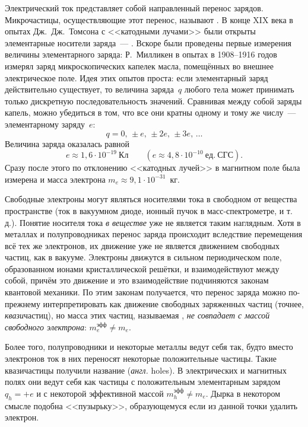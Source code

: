 Электрический ток представляет собой направленный перенос зарядов. Микрочастицы,
осуществляющие этот перенос, называют . В конце
XIX века в опытах Дж.~Дж.~Томсона с <<катодными лучами>> были открыты
элементарные носители заряда~--- . Вскоре были проведены
первые измерения величины элементарного заряда: Р.~Милликен
в опытах в 1908--1916 годов измерял заряд микроскопических капелек масла,
помещённых во внешнее электрическое поле. Идея этих опытов проста:
если элементарный заряд действительно существует, то величина заряда~$q$
любого тела может принимать только дискретную последовательность значений.
Сравнивая между собой заряды капель, можно убедиться в том, что все они
кратны одному и тому же числу~--- элементарному заряду~$e$:
\begin{equation*}
    q = 0,\,\pm e,\,\pm2e,\,\pm3e,\, \ldots
\end{equation*}
Величина заряда оказалась равной
\[
e\approx1,6\cdot 10^{-19}~Кл\qquad (e\approx 4,8\cdot 10^{-10}~ед.~СГС).
\]
Сразу после этого по отклонению <<катодных лучей>> в магнитном поле была
измерена и масса электрона $m_e\approx 9,1\cdot 10^{-31}$~кг.

Свободные электроны могут являться носителями тока в свободном от вещества
пространстве (ток в вакуумном диоде, ионный пучок в масс-спектрометре, и
т.\,д.). Понятие носителя тока \emph{в веществе} уже не является таким
наглядным. Хотя в металлах и полупроводниках перенос заряда происходит
вследствие перемещения всё тех же электронов, их движение уже не является
движением свободных частиц, как в вакууме. Электроны движутся в сильном
периодическом поле, образованном ионами кристаллической решётки, и
взаимодействуют между собой, причём это движение и это взаимодействие
подчиняются законам квантовой механики. По этим законам получается, что перенос
заряда можно по-прежнему интерпретировать как движение свободных заряженных
частиц (точнее, \emph{квази}частиц), но масса этих частиц, называемая
, \emph{не совпадает с массой свободного
электрона}: $m_{e}^{эфф}\ne m_e$.

Более того, полупроводники и некоторые металлы
ведут себя так, будто вместо электронов ток в них переносят некоторые
положительные частицы. Такие квазичастицы получили название 
(\emph{англ.} holes).
В электрических и магнитных полях они ведут себя как частицы с положительным
элементарным зарядом $q_h=+e$ и с некоторой эффективной массой
$m_h^{эфф}\ne m_e$. Дырка в некотором смысле подобна <<пузырьку>>, образующемуся
если из данной точки удалить электрон.

